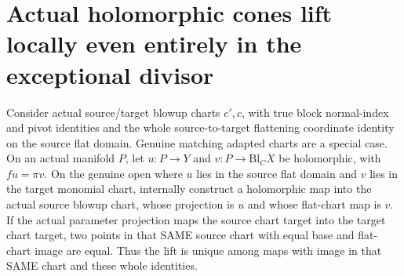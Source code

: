 \section{Actual holomorphic cones lift locally even entirely in the exceptional divisor}

\begin{lemma}
\label{hir:submersion-blowup-local-cone-entire-join}
\leanok
{}
Consider actual source/target blowup charts $c',c$, with true block normal-index and pivot identities and the whole source-to-target flattening coordinate identity on the source flat domain. Genuine matching adapted charts are a special case. On an actual manifold $P$, let $u:P\to Y$ and $v:P\to\mathrm{Bl}_C X$
be holomorphic, with $fu=\pi v$. On the genuine open where $u$ lies in the
source flat domain and $v$ lies in the target monomial chart, internally
construct a holomorphic map into the actual source blowup chart, whose
projection is $u$ and whose flat-chart map is $v$. If the actual parameter projection maps the source chart target into the target chart target, two points in that SAME source chart with equal base and flat-chart image are equal. Thus the lift is unique among maps with image in that SAME chart and these whole identities.
\end{lemma}
